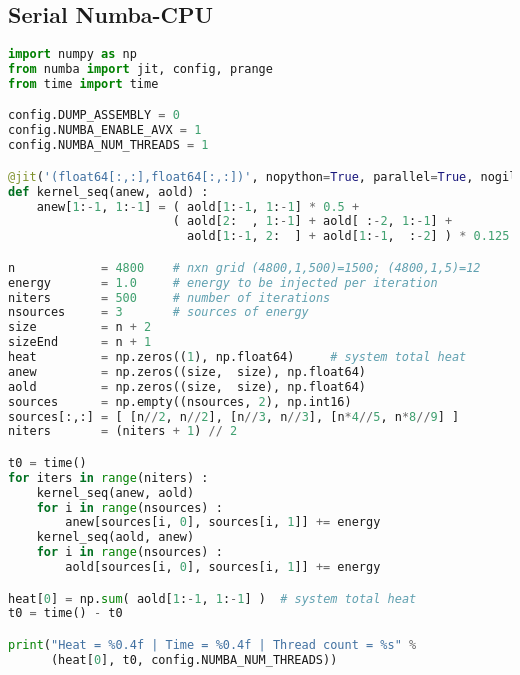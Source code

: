 \subsection{Serial Numba-CPU}
\begin{lstlisting}[language=Python, caption={Serial Numba-CPU implementation of the stencil test case.}]
import numpy as np
from numba import jit, config, prange
from time import time

config.DUMP_ASSEMBLY = 0
config.NUMBA_ENABLE_AVX = 1
config.NUMBA_NUM_THREADS = 1

@jit('(float64[:,:],float64[:,:])', nopython=True, parallel=True, nogil=True) 
def kernel_seq(anew, aold) :
    anew[1:-1, 1:-1] = ( aold[1:-1, 1:-1] * 0.5 + 
                       ( aold[2:  , 1:-1] + aold[ :-2, 1:-1] +
                         aold[1:-1, 2:  ] + aold[1:-1,  :-2] ) * 0.125 )

n            = 4800    # nxn grid (4800,1,500)=1500; (4800,1,5)=12
energy       = 1.0     # energy to be injected per iteration
niters       = 500     # number of iterations
nsources     = 3       # sources of energy
size         = n + 2
sizeEnd      = n + 1
heat         = np.zeros((1), np.float64)     # system total heat
anew         = np.zeros((size,  size), np.float64)
aold         = np.zeros((size,  size), np.float64)
sources      = np.empty((nsources, 2), np.int16)
sources[:,:] = [ [n//2, n//2], [n//3, n//3], [n*4//5, n*8//9] ]
niters       = (niters + 1) // 2

t0 = time()
for iters in range(niters) :
    kernel_seq(anew, aold)
    for i in range(nsources) :
        anew[sources[i, 0], sources[i, 1]] += energy
    kernel_seq(aold, anew)
    for i in range(nsources) :
        aold[sources[i, 0], sources[i, 1]] += energy

heat[0] = np.sum( aold[1:-1, 1:-1] )  # system total heat
t0 = time() - t0

print("Heat = %0.4f | Time = %0.4f | Thread count = %s" %
      (heat[0], t0, config.NUMBA_NUM_THREADS))
\end{lstlisting}




